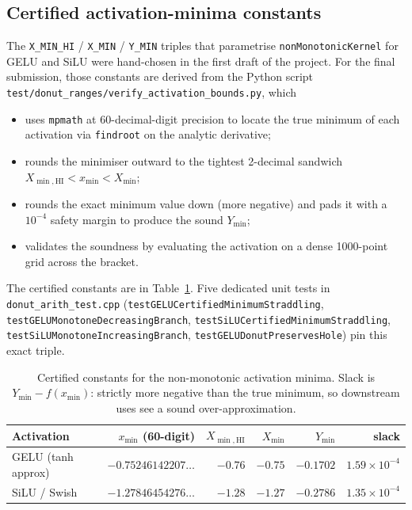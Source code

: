 \documentclass[11pt,a4paper]{article}
\theoremstyle{plain}
\begin{document}
\subsection{Certified activation-minima constants}
\label{sec:certified-constants}

The \texttt{X\_MIN\_HI} / \texttt{X\_MIN} / \texttt{Y\_MIN} triples
that parametrise \texttt{nonMonotonicKernel} for GELU and SiLU were
hand-chosen in the first draft of the project. For the final
submission, those constants are derived from the Python script
\texttt{test/donut\_ranges/verify\_activation\_bounds.py}, which

\begin{itemize}[leftmargin=1.5em]
\item uses \texttt{mpmath} at 60-decimal-digit precision to locate the
  true minimum of each activation via \texttt{findroot} on the
  analytic derivative;
\item rounds the minimiser outward to the tightest 2-decimal
  sandwich $X_{\min,\mathrm{HI}} < x_{\min} < X_{\min}$;
\item rounds the exact minimum value down (more negative) and pads it
  with a $10^{-4}$ safety margin to produce the sound $Y_{\min}$;
\item validates the soundness by evaluating the activation on a dense
  1000-point grid across the bracket.
\end{itemize}

The certified constants are in Table~\ref{tab:certified-constants}.
Five dedicated unit tests in \texttt{donut\_arith\_test.cpp}
(\texttt{testGELUCertifiedMinimumStraddling},
\texttt{testGELUMonotoneDecreasingBranch},
\texttt{testSiLUCertifiedMinimumStraddling},
\texttt{testSiLUMonotoneIncreasingBranch},
\texttt{testGELUDonutPreservesHole}) pin this exact triple.

\begin{table}[H]
\centering
\begin{tabular}{@{}lrrrrr@{}}
\toprule
Activation & $x_{\min}$ (60-digit)
& $X_{\min,\mathrm{HI}}$ & $X_{\min}$ & $Y_{\min}$ & slack \\
\midrule
GELU (tanh approx) & $-0.75246142207\ldots$ & $-0.76$ & $-0.75$
  & $-0.1702$ & $1.59\times 10^{-4}$ \\
SiLU / Swish & $-1.27846454276\ldots$ & $-1.28$ & $-1.27$
  & $-0.2786$ & $1.35\times 10^{-4}$ \\
\bottomrule
\end{tabular}
\caption{Certified constants for the non-monotonic activation
minima. Slack is $Y_{\min} - f(x_{\min})$: strictly more
negative than the true minimum, so downstream uses see a sound
over-approximation.}
\label{tab:certified-constants}
\end{table}
\end{document}
